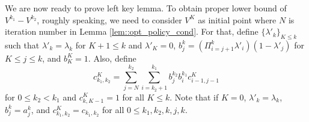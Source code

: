 \documentclass{article} %
\newcommand*{\para}[1]{\left({#1}\right)}
\begin{document}
We are now ready to prove left key lemma. To obtain proper lower bound of $V^{k_1}-V^{k_2}$, roughly speaking, we need to consider $V^K$ as initial point where $N$ is iteration number in Lemma \ref{lem::opt_policy_cond}. For that, define $\{\lambda'_k\}_{ K \le k}$ such that $\lambda'_k= \lambda_k$ for $K+1 \le k$ and $\lambda'_K= 0$, $b^k_{j} = \para{\Pi^{k}_{i=j+1}\lambda'_{i}}(1-\lambda'_{j})$ for $ K \le  j \le k$, and  $b^K_K=1$. Also, define 
\[c^K_{k_1,k_2} = \sum^{k_2}_{j=N}\sum^{k_1}_{i=k_2+1} b^{k_2}_j  b^{k_1}_i c^K_{i-1,j-1}\]
for $0 \le k_2 <k_1 $ and $c^K_{k,K-1}=1$ for all $K \le k$. Note that if $K=0$,  $\lambda'_k = \lambda_k$, $b^k_{j} =a^k_{j}$, and $c^K_{k_1,k_2}= c_{k_1,k_2}$  for all $0 \le k_1,k_2,k,j,k$.
\end{document}
